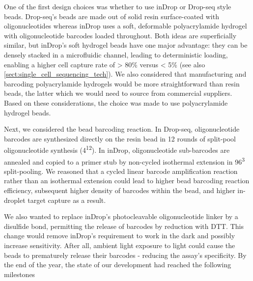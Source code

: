 One of the first design choices was whether to use inDrop or Drop-seq style beads. Drop-seq's beads are made out of solid resin surface-coated with oligonucleotides whereas inDrop uses a soft, deformable polyacrylamide hydrogel with oligonucleotide barcodes loaded throughout. Both ideas are superficially similar, but inDrop's soft hydrogel beads have one major advantage: they can be densely stacked in a microfluidic channel, leading to deterministic loading, enabling a higher cell capture rate of > 80\% versus < 5\% (see also \autoref{sect:single_cell_sequencing_tech}). We also considered that manufacturing and barcoding polyacrylamide hydrogels would be more straightforward than resin beads, the latter which we would need to source from commercial suppliers. Based on these considerations, the choice was made to use polyacrylamide hydrogel beads.


Next, we considered the bead barcoding reaction. In Drop-seq, oligonucleotide barcodes are synthesized directly on the resin bead in 12 rounds of split-pool oligonucleotide synthesis (4\textsuperscript{12}). In inDrop, oligonucleotide sub-barcodes are annealed and copied to a primer stub by non-cycled isothermal extension in 96\textsuperscript{3} split-pooling. We reasoned that a cycled linear barcode amplification reaction rather than an isothermal extension could lead to higher bead barcoding reaction efficiency, subsequent higher density of barcodes within the bead, and higher in-droplet target capture as a result.

We also wanted to replace inDrop's photocleavable oligonucleotide linker by a disulfide bond, permitting the release of barcodes by reduction with DTT. This change would remove inDrop's requirement to work in the dark and possibly increase sensitivity. After all, ambient light exposure to light could cause the beads to prematurely release their barcodes - reducing the assay's specificity. By the end of the year, the state of our development had reached the following milestones

